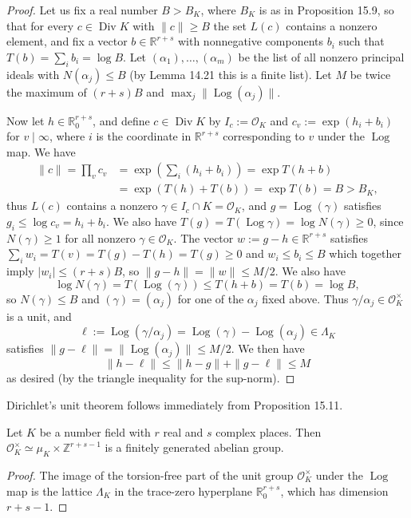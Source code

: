 \begin{proof}
Let us fix a real number $B>B_K$, where $B_K$ is as in Proposition 15.9, so that for every $c\in\operatorname{Div}K$ with $\|c\|\geq B$ the set $L(c)$ contains a nonzero element, and fix a vector $b\in\mathbb R^{r+s}$ with nonnegative components $b_i$ such that $T(b)=\sum_i b_i=\log B$. Let $(\alpha_1),\ldots,(\alpha_m)$ be the list of all nonzero principal ideals with $N(\alpha_j)\leq B$ (by Lemma 14.21 this is a finite list). Let $M$ be twice the maximum of $(r+s)B$ and $\max_j\|\operatorname{Log}(\alpha_j)\|$.

Now let $h\in\mathbb R^{r+s}_0$, and define $c\in\operatorname{Div}K$ by $I_c:=\mathcal O_K$ and $c_v:=\exp(h_i+b_i)$ for $v\mid\infty$, where $i$ is the coordinate in $\mathbb R^{r+s}$ corresponding to $v$ under the $\operatorname{Log}$ map. We have
\begin{align*}
\|c\|=\prod_v c_v
&=\exp\left(\sum_i(h_i+b_i)\right)
=\exp T(h+b)\\
&=\exp(T(h)+T(b))=\exp T(b)=B>B_K,
\end{align*}
thus $L(c)$ contains a nonzero $\gamma\in I_c\cap K=\mathcal O_K$, and $g=\operatorname{Log}(\gamma)$ satisfies $g_i\leq\log c_v=h_i+b_i$. We also have $T(g)=T(\operatorname{Log}\gamma)=\log N(\gamma)\geq0$, since $N(\gamma)\geq1$ for all nonzero $\gamma\in\mathcal O_K$. The vector $w:=g-h\in\mathbb R^{r+s}$ satisfies $\sum_i w_i=T(v)=T(g)-T(h)=T(g)\geq0$ and $w_i\leq b_i\leq B$ which together imply $|w_i|\leq(r+s)B$, so $\|g-h\|=\|w\|\leq M/2$. We also have
\[
\log N(\gamma)=T(\operatorname{Log}(\gamma))\leq T(h+b)=T(b)=\log B,
\]
so $N(\gamma)\leq B$ and $(\gamma)=(\alpha_j)$ for one of the $\alpha_j$ fixed above. Thus $\gamma/\alpha_j\in\mathcal O_K^\times$ is a unit, and
\[
\ell:=\operatorname{Log}(\gamma/\alpha_j)=\operatorname{Log}(\gamma)-\operatorname{Log}(\alpha_j)\in\Lambda_K
\]
satisfies $\|g-\ell\|=\|\operatorname{Log}(\alpha_j)\|\leq M/2$. We then have
\[
\|h-\ell\|\leq\|h-g\|+\|g-\ell\|\leq M
\]
as desired (by the triangle inequality for the sup-norm).
\end{proof}

Dirichlet's unit theorem follows immediately from Proposition 15.11.
\begin{theorem}
Let $K$ be a number field with $r$ real and $s$ complex places. Then $\mathcal O_K^\times\simeq\mu_K\times\mathbb Z^{r+s-1}$ is a finitely generated abelian group.
\end{theorem}
\begin{proof}
The image of the torsion-free part of the unit group $\mathcal O_K^\times$ under the $\operatorname{Log}$ map is the lattice $\Lambda_K$ in the trace-zero hyperplane $\mathbb R^{r+s}_0$, which has dimension $r+s-1$.
\end{proof}
